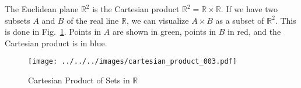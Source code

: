 \documentclass{article}
\theoremstyle{plain}
\theoremstyle{normal}
\newenvironment{example}{%
    \pushQED{\qed}\renewcommand{\qedsymbol}{$\blacksquare$}\examplex%
}{%
    \popQED\endexamplex%
}
\begin{document}
        \begin{example}
            The Euclidean plane $\mathbb{R}^{2}$ is the Cartesian product
            $\mathbb{R}^{2}=\mathbb{R}\times\mathbb{R}$.
        \end{example}
        If we have two subsets $A$ and $B$ of the real line $\mathbb{R}$, we
        can visualize $A\times{B}$ as a subset of $\mathbb{R}^{2}$.
        This is done in Fig.~\ref{fig:cartesian_product_003}. Points in $A$ are
        shown in green, points in $B$ in red, and the Cartesian product is in
        blue.
        \begin{figure}
            \centering
            \texttt{[image: ../../../images/cartesian\_product\_003.pdf]}
            \caption{Cartesian Product of Sets in $\mathbb{R}$}
            \label{fig:cartesian_product_003}
        \end{figure}
\end{document}
